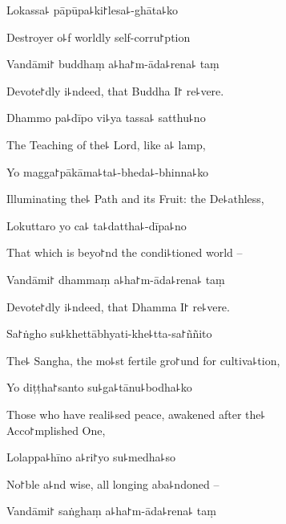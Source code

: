 Lokassa꜕ pāpūpa꜕ki꜓lesa꜕-ghāta꜕ko

\begin{english}
  Destroyer o꜕f worldly self-corru꜓ption
\end{english}

Vandāmi꜓ buddhaṃ a꜕ha꜓m-āda꜕rena꜕ taṃ

\begin{english}
  Devote꜓dly i꜕ndeed, that Buddha I꜓ re꜕vere.
\end{english}

Dhammo pa꜕dīpo vi꜕ya tassa꜕ satthu꜕no

\begin{english}
  The Teaching of the꜕ Lord, like a꜕ lamp,
\end{english}

Yo magga꜓pākāma꜕ta꜕-bheda꜕-bhinna꜕ko

\begin{english}
  Illuminating the꜕ Path and its Fruit: the De꜕athless,
\end{english}

Lokuttaro yo ca꜕ ta꜕dattha꜕-dīpa꜕no

\begin{english}
  That which is beyo꜓nd the condi꜕tioned world --
\end{english}

Vandāmi꜓ dhammaṃ a꜕ha꜓m-āda꜕rena꜕ taṃ

\begin{english}
  Devote꜓dly i꜕ndeed, that Dhamma I꜓ re꜕vere.
\end{english}

Sa꜓ṅgho su꜕khettābhyati-khe꜕tta-sa꜓ññito

\begin{english}
  The꜕ Sangha, the mo꜕st fertile gro꜓und for cultiva꜕tion,
\end{english}

Yo diṭṭha꜓santo su꜕ga꜕tānu꜕bodha꜕ko

\begin{english}
  Those who have reali꜕sed peace, awakened after the꜕ \\Acco꜓mplished One,
\end{english}

Lolappa꜕hīno a꜕ri꜓yo su꜕medha꜕so

\begin{english}
  No꜓ble a꜕nd wise, all longing aba꜕ndoned --
\end{english}

Vandāmi꜓ saṅghaṃ a꜕ha꜓m-āda꜕rena꜕ taṃ

